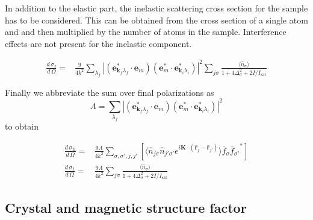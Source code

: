 \documentclass[11pt,letter]{article}
\newcommand{\bv}[1]{\ensuremath{\mathbf{#1}}}
\newcommand{\dsig}[1]{\ensuremath{ \frac{ d\,\sigma_{#1} }{d\,\Omega} }}
\begin{document}
In addition to the elastic part, the inelastic scattering cross section for the
sample has to be considered.   This can be obtained from the cross section of a
single atom and and then multiplied by the number of atoms in the sample.
Interference effects are not present for the inelastic component.   

\begin{equation}
\begin{split}
\dsig{I} =&  \frac{9}{4k^{2}} 
              \sum_{\lambda_{f}}  | (\bv{e}_{\bv{k}_{f} \lambda_{f}}^{*} \cdot \bv{e}_{m} ) 
                                   (\bv{e}_{m}^{*} \cdot \bv{e}_{\bv{k}_{i} \lambda_{i}}^{*}  ) 
                                 |^{2} 
              \sum_{j\sigma}
                     \frac{\langle \hat{n}_{\sigma} \rangle}{1+ 4\Delta_{\sigma}^{2} + 2 I / I_{\mathrm{sat}} } 
\end{split}
\end{equation}

Finally we abbreviate the sum over final polarizations as 
\begin{equation} 
 \Lambda =       \sum_{\lambda_{f}}  | (\bv{e}_{\bv{k}_{f} \lambda_{f}}^{*} \cdot \bv{e}_{m} ) 
                                   (\bv{e}_{m}^{*} \cdot \bv{e}_{\bv{k}_{i} \lambda_{i}}^{*}  ) 
                                 |^{2}
\end{equation}
to obtain 

\begin{equation}
\begin{split}
\dsig{E} =&   \frac{9\Lambda}{4k^{2}} 
               \sum_{ \sigma,\sigma', j, j' } [ \langle \hat{n}_{j\sigma}\hat{n}_{j'\sigma'}
              e^{ i \bv{K} \cdot ( \hat{\bv{r}}_{j} - \hat{\bv{r}}_{j'} )  } \rangle 
              \bar{f}_{\sigma} {\bar{f}_{\sigma'}}^{*} ] \\  
\dsig{I} =&  \frac{9\Lambda}{4k^{2}} 
              \sum_{j\sigma}
                     \frac{\langle \hat{n}_{\sigma} \rangle}{1+ 4\Delta_{\sigma}^{2} + 2 I / I_{\mathrm{sat}} } 
\end{split}
\end{equation}

\subsection{ Crystal and magnetic structure factor } 
\end{document}
